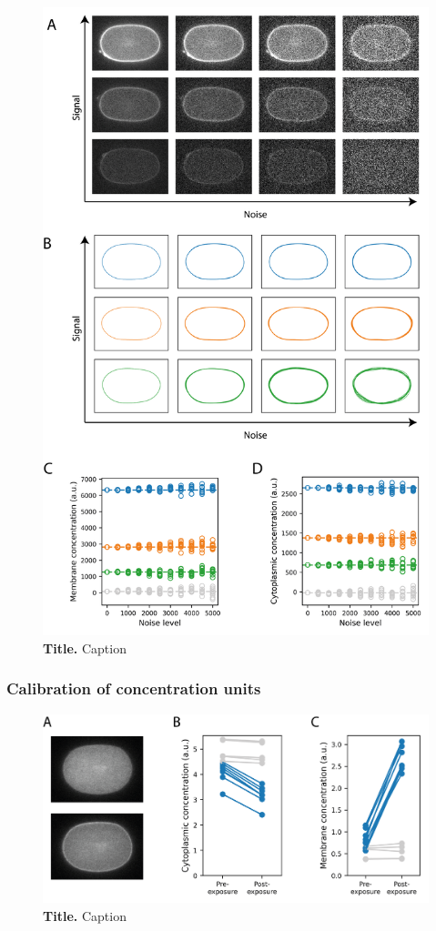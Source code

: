 \documentclass[11pt]{"article"}
\newcommand{\mycaption}[2]{\caption[#1]{\textbf{#1.} #2}}
\begin{document}
\begin{figure}[!h]
\includegraphics[scale=1]{memquant_benchmarking_noise}
\setlength{\abovecaptionskip}{20pt}
\centering
\mycaption{Title}{Caption}
\end{figure}


\clearpage
\subsubsection{Calibration of concentration units}

\begin{figure}[!h]
\includegraphics[scale=1]{memquant_optogenetics}
\setlength{\abovecaptionskip}{20pt}
\centering
\mycaption{Title}{Caption}
\end{figure}
\end{document}
